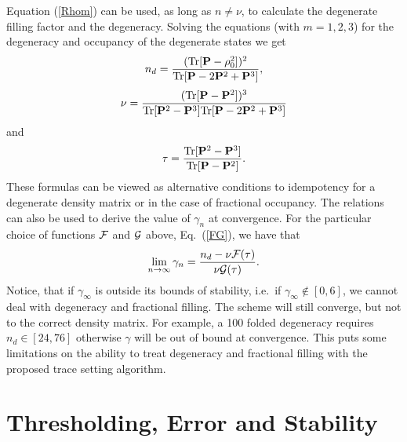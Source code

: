 \commentoutA{\documentclass[prb,aps,twocolumn,twocolumngrid,secnumarabic,superbib,hyperref]{revtex4}}
\begin{document}
Equation (\ref{Rhom}) can be used, as long as
$n \neq \nu$, to calculate the degenerate filling factor and the degeneracy.
Solving the equations (with $m=1,2,3$) for the degeneracy and occupancy
of the degenerate states we get
\begin{equation}
n_d = \frac{({\rm Tr} [{\bf P}-\rho_0^2 ])^2}{{\rm Tr} [{\bf P}-2{\bf P}^2+{\bf P}^3 ]},
\end{equation}
\begin{equation}
\nu = \frac{({\rm Tr} [{\bf P}-{\bf P}^2 ])^3}{{\rm Tr} [{\bf P}^2-{\bf P}^3 ]
{\rm Tr} [{\bf P}-2{\bf P}^2+{\bf P}^3 ]}
\end{equation}
and
\begin{equation}
\tau = \frac{{\rm Tr} [{\bf P}^2-{\bf P}^3 ]}{{\rm Tr} [{\bf P}-{\bf P}^2 ]}.
\end{equation}
These formulas can be viewed as alternative conditions to idempotency
for a degenerate density matrix or in the case of fractional occupancy. 
The relations can also be used
to derive the value of $\gamma_n$ at convergence. For the particular
choice of functions $\cal F$ and $\cal G$ above, Eq.\ (\ref{FG}), we have that
\begin{equation}
\lim_{n \rightarrow \infty} \gamma_n = \frac{n_d - \nu {\cal F}(\tau )}
                                               {\nu {\cal G}(\tau )}.
\end{equation}
Notice, that if $\gamma_{\infty}$
is outside its bounds of stability, i.e.\ if $\gamma_{\infty} \notin [0,6]$, we cannot deal with
degeneracy and fractional filling. The scheme will still
converge, but not to the correct density matrix. For example,
a 100 folded degeneracy requires $n_d \in [24,76]$ otherwise
$\gamma$ will be out of bound at convergence. This puts some
limitations on the ability to treat degeneracy and fractional filling
with the proposed trace setting algorithm.


\section{Thresholding, Error and Stability} \label{Error}
\end{document}
